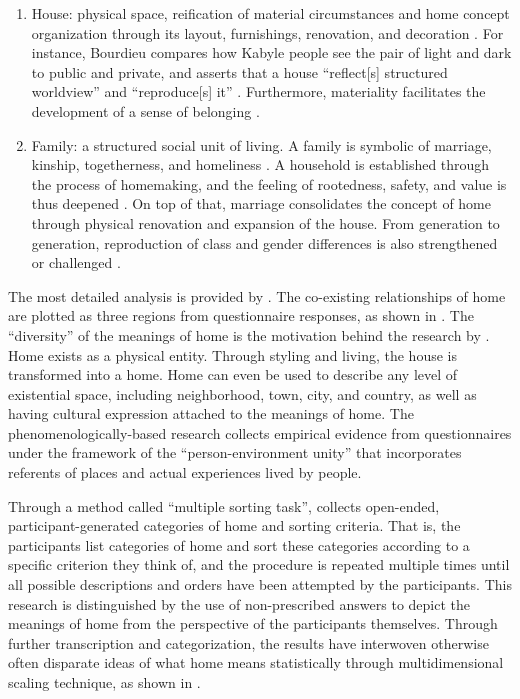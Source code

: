 \begin{enumerate}
    \item House: physical space, reification of material circumstances and home concept organization through its layout, furnishings, renovation, and decoration \parencite{samanani2019house}. For instance, Bourdieu compares how Kabyle people see the pair of light and dark to public and private, and asserts that a house ``reflect[s] structured worldview'' and ``reproduce[s] it'' \parencite{samanani2019house}. Furthermore, materiality facilitates the development of a sense of belonging \parencite{moore2000placing}.
    \item Family: a structured social unit of living. A family is symbolic of marriage, kinship, togetherness, and homeliness \parencite{samanani2019house}. A household is established through the process of homemaking, and the feeling of rootedness, safety, and value is thus deepened \parencite{samanani2019house,moore2000placing}. On top of that, marriage consolidates the concept of home through physical renovation and expansion of the house. From generation to generation, reproduction of class and gender differences is also strengthened or challenged \parencite{samanani2019house,mallett2004understanding}.
\end{enumerate}

The most detailed analysis is provided by \textcite{sixsmith1986meaning}. The co-existing relationships of home are plotted as three regions from questionnaire responses, as shown in . The ``diversity'' of the meanings of home is the motivation behind the research by \textcite{sixsmith1986meaning}. Home exists as a physical entity. Through styling and living, the house is transformed into a home. Home can even be used to describe any level of existential space, including neighborhood, town, city, and country, as well as having cultural expression attached to the meanings of home. The phenomenologically-based research collects empirical evidence from questionnaires under the framework of the ``person-environment unity'' that incorporates referents of places and actual experiences lived by people.

Through a method called ``multiple sorting task'', \textcite{sixsmith1986meaning} collects open-ended, participant-generated categories of home and sorting criteria. That is, the participants list categories of home and sort these categories according to a specific criterion they think of, and the procedure is repeated multiple times until all possible descriptions and orders have been attempted by the participants. This research is distinguished by the use of non-prescribed answers to depict the meanings of home from the perspective of the participants themselves. Through further transcription and categorization, the results have interwoven otherwise often disparate ideas of what home means statistically through multidimensional scaling technique, as shown in .

